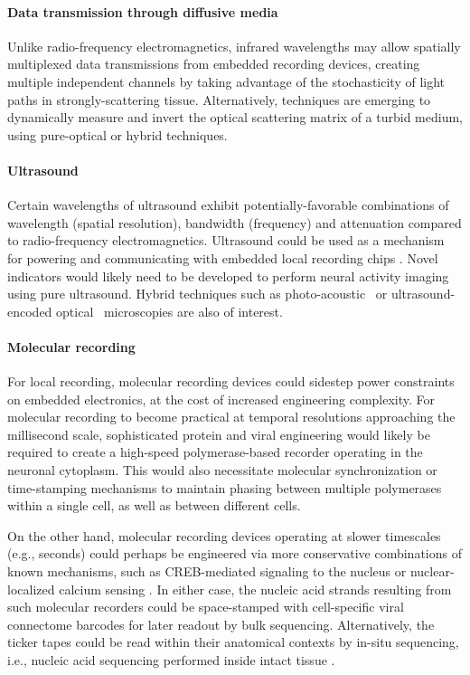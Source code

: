 \paragraph{Data transmission through diffusive media} Unlike radio-frequency electromagnetics, infrared wavelengths may allow spatially multiplexed data transmissions from embedded recording devices, creating multiple independent channels by taking advantage of the stochasticity of light paths in strongly-scattering tissue. Alternatively, techniques are emerging to dynamically measure and invert the optical scattering matrix of a turbid medium, using pure-optical or hybrid techniques.

\paragraph{Ultrasound} Certain wavelengths of ultrasound exhibit potentially-favorable combinations of wavelength (spatial resolution), bandwidth (frequency) and attenuation compared to radio-frequency electromagnetics. Ultrasound could be used as a mechanism for powering and communicating with embedded local recording chips \cite{Seo2013}. Novel indicators \cite{ShapiroGasNanostructures} would likely need to be developed to perform neural activity imaging using pure ultrasound. Hybrid techniques such as photo-acoustic~\cite{filonov12} or ultrasound-encoded optical~\cite{wang12} microscopies are also of interest.

\paragraph{Molecular recording}  For local recording, molecular recording devices could sidestep power constraints on embedded electronics, at the cost of increased engineering complexity. For molecular recording to become practical at temporal resolutions approaching the millisecond scale, sophisticated protein and viral engineering would likely be required to create a high-speed polymerase-based recorder operating in the neuronal cytoplasm. This would also necessitate molecular synchronization or time-stamping mechanisms to maintain phasing between multiple polymerases within a single cell, as well as between different cells.

On the other hand, molecular recording devices operating at slower timescales (e.g., seconds) could perhaps be engineered via more conservative combinations of known mechanisms, such as CREB-mediated signaling to the nucleus \cite{Deisseroth2012} or nuclear-localized calcium sensing \cite{schrodel2013brain}. In either case, the nucleic acid strands resulting from such molecular recorders could be space-stamped with cell-specific viral connectome barcodes \cite{zador12} for later readout by bulk sequencing. Alternatively, the ticker tapes could be read within their anatomical contexts by in-situ sequencing, i.e., nucleic acid sequencing performed inside intact tissue \cite{Lee2013InSitu}.

